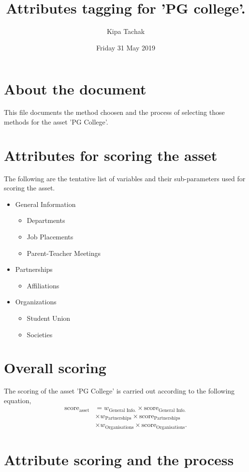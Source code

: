 \documentclass[oneside,twocolumn]{article}
\title{Attributes tagging for 'PG college'.}
\author{Kipa Tachak}
\date{Friday 31 May 2019}
\begin{document}
\maketitle

\section{About the document}
This file documents the method choosen and the process of
selecting those methods for the asset 'PG College'.
\section{Attributes for scoring the asset}
The following are the tentative list of variables and their
sub-parameters used for scoring the asset.
\begin{itemize}
\item General Information
  \begin{itemize}
  \item Departments
  \item Job Placements
  \item Parent-Teacher Meetings
  \end{itemize}
\item Partnerships
  \begin{itemize}
  \item Affiliations
  \end{itemize}
\item Organizations
  \begin{itemize}
  \item Student Union
  \item Societies
  \end{itemize}
\end{itemize}
\section{Overall scoring}
The scoring of the asset 'PG College' is carried out
according to the following equation,
\begin{align*}
  \text{score}_{\text{asset}} &= w_{\text{General Info.}} \times \text{score}_{\text{General Info.}} \\
  &\times w_{\text{Partnerships}} \times \text{score}_{\text{Partnerships}} \\
  &\times w_{\text{Organisations}} \times \text{score}_{\text{Organisations}}.
\end{align*}
\section{Attribute scoring and the process}
\end{document}
